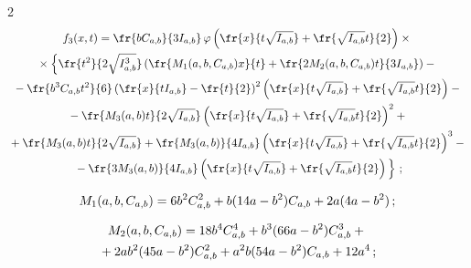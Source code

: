 \begin{multicols}{2}
\begin{multline*}
f_3(x,t) = \fr{bC_{a,b}}{3I_{a,b}}\, \varphi\left(\fr{x}{t\sqrt{I_{a,b}}} + 


\fr{\sqrt{I_{a,b}}t}{2}\right) \times{}\\


{}\times \left\{\fr{t^2}{2\sqrt{I^3_{a,b}}}\left(


\fr{M_1(a, b, C_{a,b})x}{t} + \fr{2M_2(a, b, C_{a,b})t}{3I_{a,b}}\right) -{}\right.\\


{}- \fr{b^3C_{a,b}t^2}{6}\left(\fr{x}{tI_{a,b}} - \fr{t}{2}\right)^2\left(


\fr{x}{t\sqrt{I_{a,b}}} + \fr{\sqrt{I_{a,b}}t}{2}\right)- {}\\


{}-


\fr{M_3(a,b)t}{2\sqrt{I_{a,b}}}\left(\fr{x}{t\sqrt{I_{a,b}}}+ 


\fr{\sqrt{I_{a,b}}t}{2}\right)^2 +{}\\


{}


+ \fr{M_3(a,b)t}{2\sqrt{\iab}}+ \fr{M_3(a,b)}{4I_{a,b}}\left(


\fr{x}{t\sqrt{I_{a,b}}} + \fr{\sqrt{I_{a,b}}t}{2}\right)^3 - {}\\


\left.{}-


\fr{3M_3(a,b)}{4I_{a,b}}\left(\fr{x}{t\sqrt{I_{a,b}}} + \fr{\sqrt{I_{a,b}}t}{2}\right)


\vphantom{\fr{t^2}{2\sqrt{I^3_{a,b}}}}


\right\}\,;


\end{multline*}





\noindent


$$


M_1(a, b, C_{a,b}) = 6b^2\cab^2 + b(14a - b^2)\cab + 2a(4a - b^2)\,;


$$





\noindent


\begin{multline*}


M_2(a, b, C_{a,b}) = 18b^4\cab^4 + b^3(66a - b^2)\cab^3 +{}\\


{}


+ 2ab^2(45a-b^2)\cab^2 + a^2b(54a - b^2)\cab + 12a^4\,;



\end{multline*}
\end{multicols}
